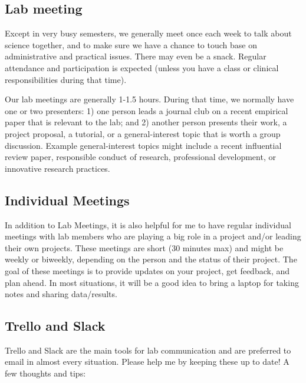 \documentclass[letterpaper,12pt,oneside]{memoir}
\begin{document}
\subsection{Lab meeting}
Except in very busy semesters, we generally meet once each week to talk about science together, and to make sure we have a chance to touch base on administrative and practical issues. There may even be a snack. Regular attendance and participation is expected (unless you have a class or clinical responsibilities during that time).

Our lab meetings are generally 1-1.5 hours. During that time, we normally have one or two presenters: 1) one person leads a journal club on a recent empirical paper that is relevant to the lab; and 2) another person presents their work, a project proposal, a tutorial, or a general-interest topic that is worth a group discussion. Example general-interest topics might include a recent influential review paper, responsible conduct of research, professional development, or innovative research practices.  

\subsection{Individual Meetings}
In addition to Lab Meetings, it is also helpful for me to have regular individual meetings with lab members who are playing a big role in a project and/or leading their own projects. These meetings are short (30 minutes max) and might be weekly or biweekly, depending on the person and the status of their project. The goal of these meetings is to provide updates on your project, get feedback, and plan ahead. In most situations, it will be a good idea to bring a laptop for taking notes and sharing data/results. 

\subsection{Trello and Slack}
Trello and Slack are the main tools for lab communication and are preferred to email in almost every situation. Please help me by keeping these up to date! A few thoughts and tips:
\end{document}
